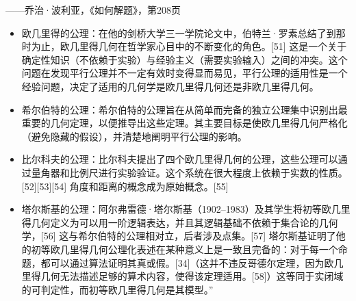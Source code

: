 ——乔治·波利亚，《如何解题》，第208页
\begin{itemize}
\item 欧几里得的公理：在他的剑桥大学三一学院论文中，伯特兰·罗素总结了到那时为止，欧几里得几何在哲学家心目中的不断变化的角色。[51] 这是一个关于确定性知识（不依赖于实验）与经验主义（需要实验输入）之间的冲突。这个问题在发现平行公理并不一定有效时变得显而易见，平行公理的适用性是一个经验问题，决定了适用的几何学是欧几里得几何还是非欧几里得几何。  
\item 希尔伯特的公理：希尔伯特的公理旨在从简单而完备的独立公理集中识别出最重要的几何定理，以便推导出这些定理。其主要目标是使欧几里得几何严格化（避免隐藏的假设），并清楚地阐明平行公理的影响。
\item 比尔科夫的公理：比尔科夫提出了四个欧几里得几何的公理，这些公理可以通过量角器和比例尺进行实验验证。这个系统在很大程度上依赖于实数的性质。[52][53][54] 角度和距离的概念成为原始概念。[55]
\item 塔尔斯基的公理：阿尔弗雷德·塔尔斯基（1902–1983）及其学生将初等欧几里得几何定义为可以用一阶逻辑表达，并且其逻辑基础不依赖于集合论的几何学，[56] 这与希尔伯特的公理相对立，后者涉及点集。[57] 塔尔斯基证明了他的初等欧几里得几何公理化表述在某种意义上是一致且完备的：对于每一个命题，都可以通过算法证明其真或假。[34]（这并不违反哥德尔定理，因为欧几里得几何无法描述足够的算术内容，使得该定理适用。[58]）这等同于实闭域的可判定性，而初等欧几里得几何是其模型。”
\end{itemize}